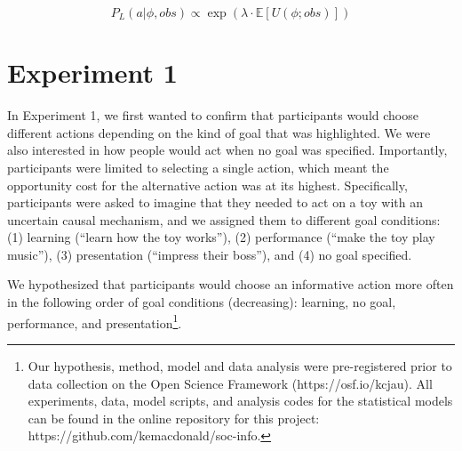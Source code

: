 \documentclass[10pt, letterpaper]{article}
\begin{document}
\[ P_L(a | \phi, obs) \propto \exp(\lambda \cdot \mathbb{E}[U(\phi; obs)])\]

\section{Experiment 1}\label{experiment-1}

In Experiment 1, we first wanted to confirm that participants would
choose different actions depending on the kind of goal that was
highlighted. We were also interested in how people would act when no
goal was specified. Importantly, participants were limited to selecting
a single action, which meant the opportunity cost for the alternative
action was at its highest. Specifically, participants were asked to
imagine that they needed to act on a toy with an uncertain causal
mechanism, and we assigned them to different goal conditions: (1)
learning (``learn how the toy works''), (2) performance (``make the toy
play music''), (3) presentation (``impress their boss''), and (4) no
goal specified.

We hypothesized that participants would choose an informative action
more often in the following order of goal conditions (decreasing):
learning, no goal, performance, and
presentation\footnote{Our hypothesis, method, model and data analysis were pre-registered prior to data collection on the Open Science Framework (https://osf.io/kcjau). All experiments, data, model scripts, and analysis codes for the statistical models can be found in the online repository for this project: https://github.com/kemacdonald/soc-info.}.
\end{document}
